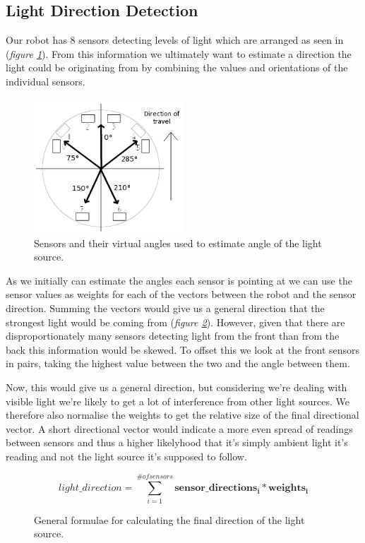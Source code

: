 \documentclass[paper=a4, fontsize=12pt]{scrartcl}	%
\numberwithin{equation}{section}		%
\numberwithin{figure}{section}			%
\numberwithin{table}{section}				%
\begin{document}
\subsection{Light Direction Detection}
\label{LDD}
Our robot has 8 sensors detecting levels of light which are arranged as seen in (\emph{figure \ref{fig:img_sensors}}). From this information we ultimately want to estimate a direction the light could be originating from by combining the values and orientations of the individual sensors.

\begin{figure}[!ht]
 \centering
  \includegraphics[width=0.5\textwidth]{IRSensors2}
  \caption{Sensors and their virtual angles used to estimate angle of the light source.}
\label{fig:img_sensors}
\end{figure}

As we initially can estimate the angles each sensor is pointing at we can use the sensor values as weights for each of the vectors between the robot and the sensor direction. Summing the vectors would give us a general direction that the strongest light would be coming from (\emph{figure \ref{fig:dir_formula}}). However, given that there are disproportionately many sensors detecting light from the front than from the back this information would be skewed. To offset this we look at the front sensors in pairs, taking the highest value between the two and the angle between them.

Now, this would give us a general direction, but considering we're dealing with visible light we're likely to get a lot of interference from other light sources. We therefore also normalise the weights to get the relative size of the final directional vector. A short directional vector would indicate a more even spread of readings between sensors and thus a higher likelyhood that it's simply ambient light it's reading and not the light source it's supposed to follow.

\begin{figure}[!ht]
\[
  light\_direction = \sum_{i=1}^{\# of sensors} \mathbf{sensor\_directions_i}*\mathbf{weights_i}
\]
\caption{General formulae for calculating the final direction of the light source.}
\label{fig:dir_formula}
\end{figure}
\end{document}
